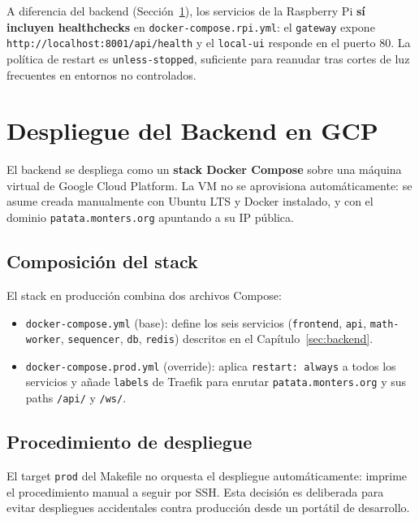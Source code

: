 A diferencia del backend (Sección~\ref{sec:despliegue_backend}), los servicios de la
Raspberry Pi \textbf{sí incluyen healthchecks} en
\texttt{docker-compose.rpi.yml}: el \texttt{gateway} expone
\texttt{http://localhost:8001/api/health} y el \texttt{local-ui} responde en el puerto
80. La política de restart es \texttt{unless-stopped}, suficiente para reanudar tras
cortes de luz frecuentes en entornos no controlados.

\section{Despliegue del Backend en GCP}
\label{sec:despliegue_backend}

El backend se despliega como un \textbf{stack Docker Compose} sobre una máquina
virtual de Google Cloud Platform. La VM no se aprovisiona automáticamente: se
asume creada manualmente con Ubuntu LTS y Docker instalado, y con el dominio
\texttt{patata.monters.org} apuntando a su IP pública.

\subsection{Composición del stack}

El stack en producción combina dos archivos Compose:

\begin{itemize}[leftmargin=*, label=--]
    \item \texttt{docker-compose.yml} (base): define los seis servicios
          (\texttt{frontend}, \texttt{api}, \texttt{math-worker}, \texttt{sequencer},
          \texttt{db}, \texttt{redis}) descritos en el Capítulo~\ref{sec:backend}.
    \item \texttt{docker-compose.prod.yml} (override): aplica \texttt{restart:
          always} a todos los servicios y añade \texttt{labels} de Traefik para
          enrutar \texttt{patata.monters.org} y sus paths \texttt{/api/} y
          \texttt{/ws/}.
\end{itemize}

\subsection{Procedimiento de despliegue}

El target \texttt{prod} del Makefile no orquesta el despliegue automáticamente:
imprime el procedimiento manual a seguir por SSH. Esta decisión es deliberada para
evitar despliegues accidentales contra producción desde un portátil de desarrollo.


